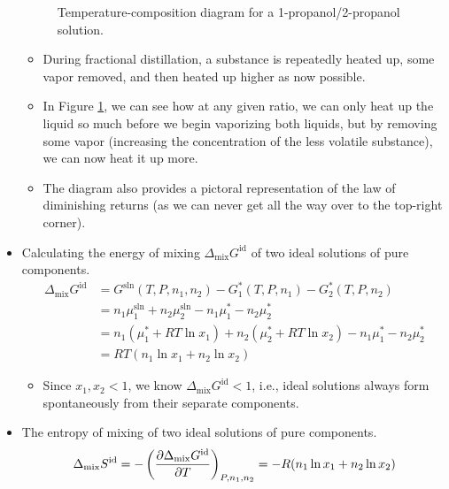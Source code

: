 \documentclass[../notes.tex]{subfiles}
\begin{document}
\begin{itemize}
\begin{figure}[h!]
        \caption{Temperature-composition diagram for a 1-propanol/2-propanol solution.}
        \label{fig:TCdiagram}
    \end{figure}
    \begin{itemize}
        \item During fractional distillation, a substance is repeatedly heated up, some vapor removed, and then heated up higher as now possible.
        \item In Figure \ref{fig:TCdiagram}, we can see how at any given ratio, we can only heat up the liquid so much before we begin vaporizing both liquids, but by removing some vapor (increasing the concentration of the less volatile substance), we can now heat it up more.
        \item The diagram also provides a pictoral representation of the law of diminishing returns (as we can never get all the way over to the top-right corner).
    \end{itemize}
    \item Calculating the energy of mixing $\Delta_\text{mix}G^\text{id}$ of two ideal solutions of pure components.
    \begin{align*}
        \Delta_\text{mix}G^\text{id} &= G^\text{sln}(T,P,n_1,n_2)-G_1^*(T,P,n_1)-G_2^*(T,P,n_2)\\
        &= n_1\mu_1^\text{sln}+n_2\mu_2^\text{sln}-n_1\mu_1^*-n_2\mu_2^*\\
        &= n_1(\mu_1^*+RT\ln x_1)+n_2(\mu_2^*+RT\ln x_2)-n_1\mu_1^*-n_2\mu_2^*\\
        &= RT(n_1\ln x_1+n_2\ln x_2)
    \end{align*}
    \begin{itemize}
        \item Since $x_1,x_2<1$, we know $\Delta_\text{mix}G^\text{id}<1$, i.e., ideal solutions always form spontaneously from their separate components.
    \end{itemize}
    \item The entropy of mixing of two ideal solutions of pure components.
    \begin{equation*}
        \Delta_\text{mix}S^\text{id} = -\left( \pdv{\Delta_\text{mix}G^\text{id}}{T} \right)_{P,n_1,n_2}
        = -R(n_1\ln x_1+n_2\ln x_2)
    \end{equation*}
    \begin{itemize}

\end{itemize}
\end{itemize}
\end{document}
